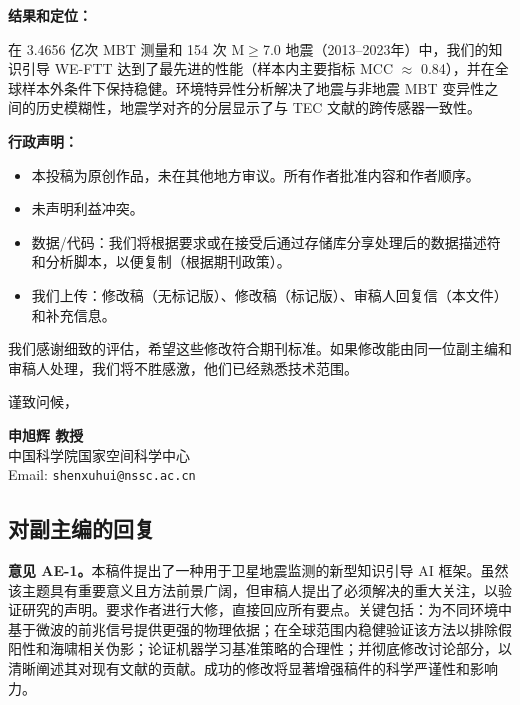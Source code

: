 \documentclass[12pt]{article}
\newcommand{\revcomment}[1]{\begingroup\color{commentcolor}#1\endgroup}
\begin{document}
\noindent\textbf{结果和定位：}

在 3.4656 亿次 MBT 测量和 154 次 M$\ge$7.0 地震（2013--2023年）中，我们的知识引导 WE-FTT 达到了最先进的性能（样本内主要指标 MCC $\approx$ 0.84），并在全球样本外条件下保持稳健。环境特异性分析解决了地震与非地震 MBT 变异性之间的历史模糊性，地震学对齐的分层显示了与 TEC 文献的跨传感器一致性。

\medskip

\noindent\textbf{行政声明：}

\begin{itemize}
\item 本投稿为原创作品，未在其他地方审议。所有作者批准内容和作者顺序。
\item 未声明利益冲突。
\item 数据/代码：我们将根据要求或在接受后通过存储库分享处理后的数据描述符和分析脚本，以便复制（根据期刊政策）。
\item 我们上传：修改稿（无标记版）、修改稿（标记版）、审稿人回复信（本文件）和补充信息。
\end{itemize}

我们感谢细致的评估，希望这些修改符合期刊标准。如果修改能由同一位副主编和审稿人处理，我们将不胜感激，他们已经熟悉技术范围。

\bigskip

谨致问候，\\[0.5em]
\vspace{2em}

\textbf{申旭辉 教授}\\
中国科学院国家空间科学中心\\
Email: \texttt{shenxuhui@nssc.ac.cn}

\bigskip

\newpage

\pagestyle{plain}

\onehalfspacing

\subsection*{对副主编的回复}

\revcomment{%
\textbf{意见 AE-1。}本稿件提出了一种用于卫星地震监测的新型知识引导 AI 框架。虽然该主题具有重要意义且方法前景广阔，但审稿人提出了必须解决的重大关注，以验证研究的声明。要求作者进行大修，直接回应所有要点。关键包括：为不同环境中基于微波的前兆信号提供更强的物理依据；在全球范围内稳健验证该方法以排除假阳性和海啸相关伪影；论证机器学习基准策略的合理性；并彻底修改讨论部分，以清晰阐述其对现有文献的贡献。成功的修改将显著增强稿件的科学严谨性和影响力。
}
\end{document}
